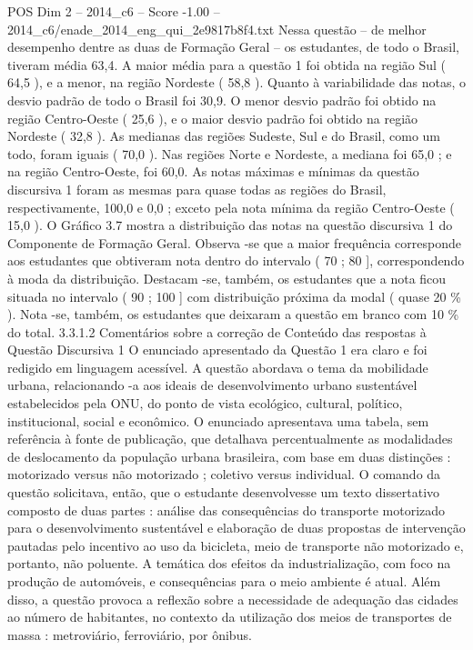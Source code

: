 \begin{textsample}{POS Dim 2 – 2014\_c6 – Score -1.00 – 2014\_c6/enade\_2014\_eng\_qui\_2e9817b8f4.txt}
Nessa questão – de melhor desempenho dentre as duas de Formação Geral – os estudantes, de todo o Brasil, tiveram média 63,4.
A maior média para a questão 1 foi obtida na região Sul ( 64,5 ), e a menor, na região Nordeste ( 58,8 ).
Quanto à variabilidade das notas, o desvio padrão de todo o Brasil foi 30,9.
O menor desvio padrão foi obtido na região Centro-Oeste ( 25,6 ), e o maior desvio padrão foi obtido na região Nordeste ( 32,8 ).
As medianas das regiões Sudeste, Sul e do Brasil, como um todo, foram iguais ( 70,0 ).
Nas regiões Norte e Nordeste, a mediana foi 65,0 ; e na região Centro-Oeste, foi 60,0.
As notas máximas e mínimas da questão discursiva 1 foram as mesmas para quase todas as regiões do Brasil, respectivamente, 100,0 e 0,0 ; exceto pela nota mínima da região Centro-Oeste ( 15,0 ).
O Gráfico 3.7 mostra a distribuição das notas na questão discursiva 1 do Componente de Formação Geral.
Observa -se que a maior frequência corresponde aos estudantes que obtiveram nota dentro do intervalo ( 70 ; 80 ], correspondendo à moda da distribuição.
Destacam -se, também, os estudantes que a nota ficou situada no intervalo ( 90 ; 100 ] com distribuição próxima da modal ( quase 20 \% ).
Nota -se, também, os estudantes que deixaram a questão em branco com 10 \% do total. 3.3.1.2 Comentários sobre a correção de Conteúdo das respostas à Questão Discursiva 1 O enunciado apresentado da Questão 1 era claro e foi redigido em linguagem acessível.
A questão abordava o tema da mobilidade urbana, relacionando -a aos ideais de desenvolvimento urbano sustentável estabelecidos pela ONU, do ponto de vista ecológico, cultural, político, institucional, social e econômico.
O enunciado apresentava uma tabela, sem referência à fonte de publicação, que detalhava percentualmente as modalidades de deslocamento da população urbana brasileira, com base em duas distinções : motorizado versus não motorizado ; coletivo versus individual.
O comando da questão solicitava, então, que o estudante desenvolvesse um texto dissertativo composto de duas partes : análise das consequências do transporte motorizado para o desenvolvimento sustentável e elaboração de duas propostas de intervenção pautadas pelo incentivo ao uso da bicicleta, meio de transporte não motorizado e, portanto, não poluente.
A temática dos efeitos da industrialização, com foco na produção de automóveis, e consequências para o meio ambiente é atual.
Além disso, a questão provoca a reflexão sobre a necessidade de adequação das cidades ao número de habitantes, no contexto da utilização dos meios de transportes de massa : metroviário, ferroviário, por ônibus.

\end{textsample}

